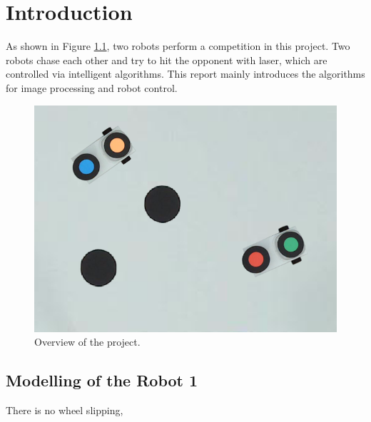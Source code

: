\chapter{Introduction}
\renewcommand{\thepage}{\arabic{page}}
\setcounter{page}{1}

As shown in Figure \ref{intro}, two robots perform a competition in this project. Two robots chase each other and try to hit the opponent with laser, which are controlled via intelligent algorithms. This report mainly introduces the algorithms for image processing and robot control.

\begin{figure}[thb]
    \centering
    \includegraphics[width=1\textwidth]{images/intro.png}
    \caption[Overview of the project]{Overview of the project.}
    \label{intro}
\end{figure}

\section{Modelling of the Robot 1}

There is no wheel slipping, 

